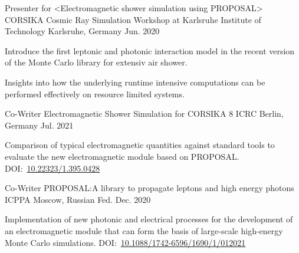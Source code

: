 \documentclass[11pt, a4paper]{Awesome-CV/awesome-cv}
\begin{document}
\begin{cventries}
    \cventry
    {Presenter for <Electromagnetic shower simulation using PROPOSAL>} %
    {CORSIKA Cosmic Ray Simulation Workshop at Karlsruhe Institute of Technology} %
    {Karlsruhe, Germany} %
    {Jun. 2020} %
    {
        \begin{cvitems} %
        \item {Introduce the first leptonic and photonic interaction model in
                the recent version of the Monte Carlo library for extensiv air
            shower.}
        \item {Insights into how the underlying runtime intensive computations can be performed effectively on resource limited systems.}
        \end{cvitems}
    }

    \cventry
    {Co-Writer} %
    {Electromagnetic Shower Simulation for CORSIKA 8} %
    {ICRC Berlin, Germany} %
    {Jul. 2021} %
    {
        \begin{cvitems} %
        \item {Comparison of typical electromagnetic quantities against standard tools to evaluate the new electromagnetic module based on PROPOSAL.  DOI:~\href{https://doi.org/10.22323/1.395.0428}{10.22323/1.395.0428}
            }
        \end{cvitems}
    }

    \cventry
    {Co-Writer} %
    {PROPOSAL:\@ A library to propagate leptons and high energy photons} %
    {ICPPA Moscow, Russian Fed.} %
    {Dec. 2020} %
    {
        \begin{cvitems} %
        \item {Implementation of new photonic and electrical processes for the
                development of an electromagnetic module that can form the basis of
            large-scale high-energy Monte Carlo simulations. DOI:~\href{https://doi.org/10.1088/1742-6596/1690/1/012021}{10.1088/1742-6596/1690/1/012021}}
        \end{cvitems}
    }
\end{cventries}
\end{document}
